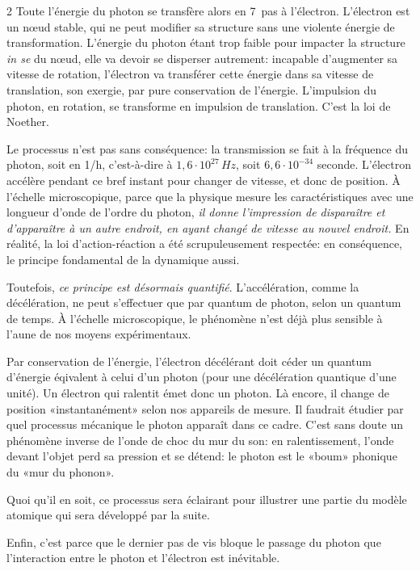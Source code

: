 \begin{multicols}{2}
Toute l'énergie du photon se transfère alors en 7~pas à l'électron.
L'électron est un nœud stable, qui ne peut modifier sa structure sans une
violente énergie de transformation. L'énergie du photon étant trop
faible pour impacter la structure \textit{in se} du nœud, elle va devoir se
disperser autrement: incapable d'augmenter sa vitesse de rotation,
l'électron va transférer cette énergie dans sa vitesse de translation,
son exergie, par pure conservation de l'énergie. L'impulsion du
photon, en rotation, se transforme en impulsion de translation. C'est
la loi de Noether.

Le processus n'est pas sans conséquence: la transmission se fait à la
fréquence du photon, soit en 1/h, c'est-à-dire à $1,6 \cdot 10^{27}\,Hz$, soit
$6,6 \cdot 10^{-34}$ seconde. L'électron accélère pendant ce bref instant pour
changer de vitesse, et donc de position. À l'échelle microscopique,
parce que la physique mesure les caractéristiques avec une longueur
d'onde de l'ordre du photon, \textit{il donne l'impression de disparaître et
d'apparaître à un autre endroit, en ayant changé de vitesse au nouvel
endroit.} En réalité, la loi d'action-réaction a été scrupuleusement
respectée: en conséquence, le principe fondamental de la dynamique
aussi.

Toutefois, \textit{ce principe est désormais quantifié}. L'accélération, comme
la décélération, ne peut s'effectuer que par quantum de photon, selon
un quantum de temps. À l'échelle microscopique, le phénomène n'est
déjà plus sensible à l'aune de nos moyens expérimentaux.

Par conservation de l'énergie, l'électron décélérant doit céder un
quantum d'énergie éqivalent à celui d'un photon (pour une décélération
quantique d'une unité). Un électron qui ralentit émet donc un photon.
Là encore, il change de position «instantanément» selon nos
appareils de mesure. Il faudrait étudier par quel processus mécanique
le photon apparaît dans ce cadre. C'est sans doute un phénomène
inverse de l'onde de choc du mur du son: en ralentissement, l'onde
devant l'objet perd sa pression et se détend: le photon est le «boum» phonique du «mur du phonon».

Quoi qu'il en soit, ce processus sera éclairant pour illustrer une partie du modèle
atomique qui sera développé par la suite.

Enfin, c'est parce que le dernier pas de vis bloque le passage du
photon que l'interaction entre le photon et l'électron est inévitable.


\end{multicols}
